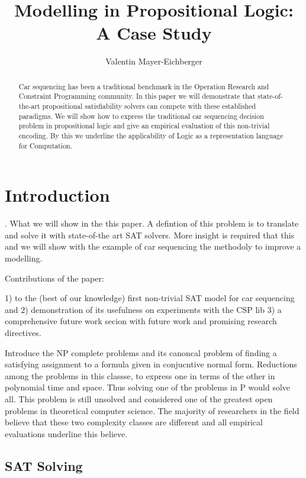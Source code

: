 \documentclass[]{llncs}
\author{Valentin Mayer-Eichberger}
\institute{NICTA and University of New South Wales \\
\email{valentin.mayer-eichberger@nicta.com.au}}
\title{Modelling in Propositional Logic: A Case Study}
\newcommand{\todo}[1]{ {\color{red}{#1} }}
\begin{document}
 

\maketitle

\begin{abstract}
    Car sequencing has been a traditional benchmark in the Operation Research and Constraint Programming community. In
    this paper we will demonstrate that state-of-the-art propositional satisfiability solvers can compete with these
    established paradigms. We will show how to express the traditional car sequencing decision problem in propositional
    logic and give an empirical evaluation of this non-trivial encoding. By this we underline the applicability of Logic
    as a representation language for Computation.
\end{abstract}

\section{Introduction}
 
\todo{3. Do the introduction fully}. What we will show in the this paper. A defintion of this problem is to translate and solve it with state-of-the art
SAT solvers. More insight is required that this and we will show with  the example of car sequencing the methodoly to
improve a modelling. 

Contributions of the paper: 

1) to the (best of our knowledge) first non-trivial SAT model for car sequencing and 2) demonstration of its usefulness
on experiments with the CSP lib 3) a comprehensive future work secion with future work and promising research
directives. 

Introduce the NP complete problems \cite{Johnson79} and its canoncal problem of finding a satisfying assignment to a
formula given in conjucntive normal form. Reductions among the problems in this classse, to express one in terms of the
other in polynomial time and space. Thus solving one of the problems in P would solve all. This problem is still unsolved
and considered one of the greatest open problems in theoretical computer science. The majority of researchers in the
field believe that these two complexity classes are different and all empirical evaluations underline this believe. 

\subsection{SAT Solving}
\end{document}
